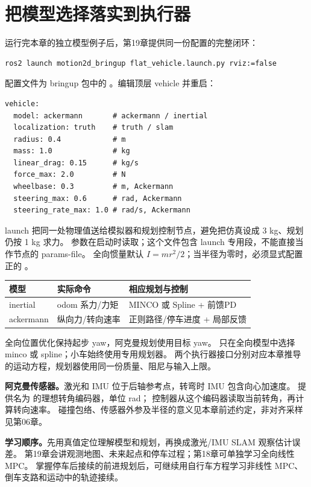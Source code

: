 \section{把模型选择落实到执行器}
运行完本章的独立模型例子后，第19章提供同一份配置的完整闭环：
\begin{lstlisting}[language=bash,numbers=none]
ros2 launch motion2d_bringup flat_vehicle.launch.py rviz:=false
\end{lstlisting}
配置文件为 bringup 包中的 。编辑顶层 vehicle 并重启：
\begin{lstlisting}[numbers=none]
vehicle:
  model: ackermann       # ackermann / inertial
  localization: truth    # truth / slam
  radius: 0.4            # m
  mass: 1.0              # kg
  linear_drag: 0.15      # kg/s
  force_max: 2.0         # N
  wheelbase: 0.3         # m, Ackermann
  steering_max: 0.6      # rad, Ackermann
  steering_rate_max: 1.0 # rad/s, Ackermann
\end{lstlisting}
launch 把同一处物理值送给模拟器和规划控制节点，避免把仿真设成 3 kg、规划仍按 1 kg 求力。
参数在启动时读取；这个文件包含 launch 专用段，不能直接当作节点的 params-file。
全向惯量默认 $I=mr^2/2$；当半径为零时，必须显式配置正的 。

\begin{center}\small
\begin{tabular}{lll}\toprule
模型 & 实际命令 & 相应规划与控制\\\midrule
inertial & odom 系力/力矩 & MINCO 或 Spline + 前馈PD\\
ackermann & 纵向力/转向速率 & 正则路径/停车进度 + 局部反馈\\\bottomrule
\end{tabular}
\end{center}
全向位置优化保持起步 yaw，阿克曼规划使用目标 yaw。
 只在全向模型中选择 minco 或 spline；小车始终使用专用规划器。
两个执行器接口分别对应本章推导的运动方程，规划器使用同一份质量、阻尼与输入上限。

\textbf{阿克曼传感器。}激光和 IMU 位于后轴参考点，转弯时 IMU 包含向心加速度。
 提供名为  的理想转角编码器，单位 rad；
控制器从这个编码器读取当前转角，再计算转向速率。
碰撞包络、传感器外参及半径的意义见本章前述约定，非对齐采样见第06章。

\textbf{学习顺序。}先用真值定位理解模型和规划，再换成激光/IMU SLAM 观察估计误差。
第19章会讲观测地图、未来起点和停车过程；第18章可单独学习全向线性 MPC。
掌握停车后接续的前进规划后，可继续用自行车方程学习非线性 MPC、倒车支路和运动中的轨迹接续。
